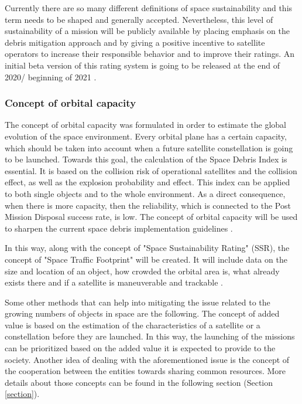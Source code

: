 Currently there are so many different definitions of space sustainability and this term needs to be shaped and generally accepted. Nevertheless, this level of sustainability of a mission will be publicly available by placing emphasis on the debris mitigation approach and by giving a positive incentive to satellite operators to increase their responsible behavior and to improve their ratings. An initial beta version of this rating system is going to be released at the end of 2020/ beginning of 2021 \cite{Space sustainability}.

\bigskip
\subsubsection{Concept of orbital capacity}
\bigskip

The concept of orbital capacity was formulated in order to estimate the global evolution of the space environment. Every orbital plane has a certain capacity, which should be taken into account when a future satellite constellation is going to be launched. Towards this goal, the calculation of the Space Debris Index is essential. It is based on the collision risk of operational satellites and the collision effect, as well as the explosion probability and effect. This index can be applied to both single objects and to the whole environment. As a direct consequence, when there is more capacity, then the reliability, which is connected to the Post Mission Disposal success rate, is low. The concept of orbital capacity will be used to sharpen the current space debris implementation guidelines \cite{Letizia 2019}.

In this way, along with the concept of "Space Sustainability Rating" (SSR), the concept of "Space Traffic Footprint" will be created. It will include data on the size and location of an object, how crowded the orbital area is, what already exists there and if a satellite is maneuverable and trackable \cite{Space sustainability}.

\bigskip
Some other methods that can help into mitigating the issue related to the growing numbers of objects in space are the following. The concept of added value is based on the estimation of the characteristics of a satellite or a constellation before they are launched. In this way, the launching of the missions can be prioritized based on the added value it is expected to provide to the society. Another idea of dealing with the aforementioned issue is the concept of the cooperation between the entities towards sharing common resources. More details about those concepts can be found in the following section (Section \ref{section}).


